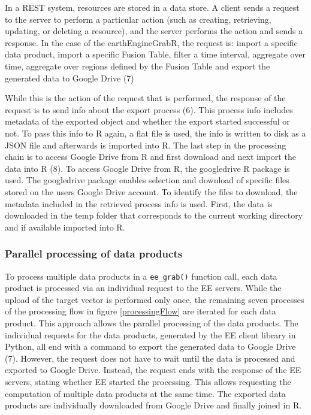 In a REST system, resources are stored in a data store. A client sends a request to the server to perform a particular action (such as creating, retrieving, updating, or deleting a resource), and the server performs the action and sends a response. In the case of the earthEngineGrabR, the request is: import a specific data product, import a specific Fusion Table, filter a time interval, aggregate over time, aggregate over regions defined by the Fusion Table and export the generated data to Google Drive (7)

While this is the action of the request that is performed, the response of the request is to send info about the export process (6). This process info includes metadata of the exported object and whether the export started successful or not. To pass this info to R again, a flat file is used, the info is written to disk as a JSON file and afterwards is imported into R. The last step in the processing chain is to access Google Drive from R and first download and next import the data into R (8). To access Google Drive from R, the googledrive R package is used. The googledrive package enables selection and download of specific files stored on the users Google Drive account. To identify the files to download, the metadata included in the retrieved process info is used. First, the data is downloaded in the temp folder that corresponds to the current working directory and if available imported into R.

\subsubsection{Parallel processing of data products}


To process multiple data products in a \texttt{ee\_grab()} function call, each data product is processed via an individual request to the EE servers. While the upload of the target vector is performed only once, the remaining seven processes of the processing flow in figure \ref{processingFlow} are iterated for each data product. This approach allows the parallel processing of the data products. The individual requests for the data products, generated by the EE client library in Python, all end with a command to export the generated data to Google Drive (7). However, the request does not have to wait until the data is processed and exported to Google Drive. Instead, the request ends with the response of the EE servers, stating whether EE started the processing. 
This allows requesting the computation of multiple data products at the same time. The exported data products are individually downloaded from Google Drive and finally joined in R.


